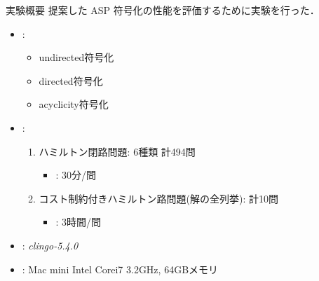 \documentclass[dvipdfmx,10pt]{beamer}
\begin{document}
\begin{frame}{実験概要}
  提案した ASP 符号化の性能を評価するために実験を行った．
  \begin{itemize}
  \item {}:
    \begin{itemize}
    \item \textsf{undirected}符号化
    \item \textsf{directed}符号化
    \item \textsf{acyclicity}符号化
    \end{itemize}
  \item {}:
    \begin{enumerate}
    \item ハミルトン閉路問題: 6種類 計494問
      \begin{itemize}
      \item {}: 30分/問
      \end{itemize}
    \item コスト制約付きハミルトン路問題(解の全列挙): 計10問
      \begin{itemize}
      \item {}: 3時間/問
      \end{itemize}
    \end{enumerate}
  \item {}: \textit{clingo-5.4.0}
  \item {}: Mac mini Intel Corei7 3.2GHz, 64GBメモリ
  \end{itemize}
\end{frame}
\end{document}
